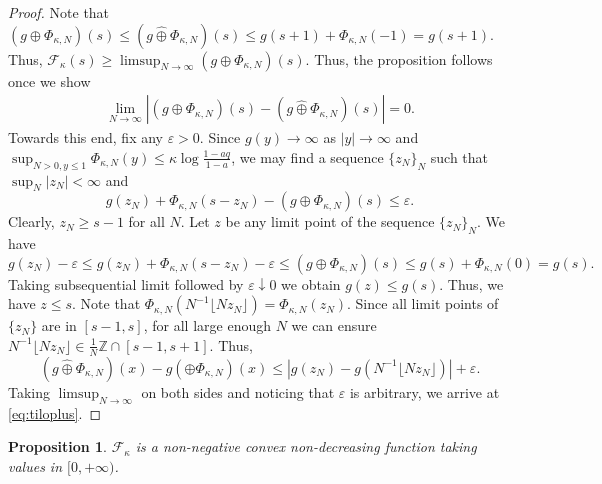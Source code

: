 \documentclass[reqno,11pt]{amsart}
\newcommand{\e}{\varepsilon}
\renewcommand{\hat}{\widehat}
\numberwithin{equation}{section}
\newtheorem{proposition}{Proposition}[section]
\theoremstyle{definition}
\newcommand{\Z}{\mathbb{Z}}
\begin{document}
\begin{proof}
Note that $ \left(g\oplus \Phi_{\kappa,N} \right)(s) \le \left(  g \hat\oplus \Phi_{\kappa,N} \right)(s)   \le g(s+1)+\Phi_{\kappa,N}(-1)=g(s+1)$.  Thus, $\mathcal{F}_\kappa(s) \ge \limsup_{N\to \infty} \left(g\oplus \Phi_{\kappa,N} \right)(s)$. Thus, the proposition follows once we show
    \begin{align}\label{eq:tiloplus}
        \lim_{N\to \infty} |\left(g\oplus \Phi_{\kappa,N} \right)(s)-\left(g\hat\oplus \Phi_{\kappa,N} \right)(s)|=0.
    \end{align}
Towards this end, fix any $\varepsilon>0$. Since $g(y)\to \infty$ as $|y|\to \infty$ and $\sup_{N>0, y\le 1} \Phi_{\kappa,N}(y) \le \kappa \log \frac{1-aq}{1-a}$, we may find a sequence $\{z_N\}_N$ such that $\sup_N |z_N|<\infty$ and 
$$g(z_N)+\Phi_{\kappa,N}(s-z_N)-(g\oplus \Phi_{\kappa,N})(s) \le \e.$$ 
Clearly, $z_N\ge s-1$ for all $N$. Let $z$ be any limit point of the sequence $\{z_N\}_N$. We have 
$$g(z_N)-\e\le g(z_N)+\Phi_{\kappa,N}(s-z_N)-\varepsilon \le (g\oplus \Phi_{\kappa,N})(s) \le g(s)+\Phi_{\kappa,N}(0)=g(s).$$ 
Taking subsequential limit followed by $\e\downarrow 0$ we obtain $g(z) \le g(s)$. Thus, we have $z\le s$. Note that $\Phi_{\kappa,N}(N^{-1}\lfloor Nz_N\rfloor)=\Phi_{\kappa,N}(z_N)$. Since all limit points of $\{z_N\}$ are in $[s-1,s]$, for all large enough $N$ we can ensure $N^{-1}\lfloor Nz_N\rfloor \in \frac1N\Z\cap[s-1,s+1]$. Thus,
$$(g\hat\oplus\Phi_{\kappa,N})(x)-g(\oplus \Phi_{\kappa,N})(x) \le |g(z_N)-g(N^{-1}\lfloor Nz_N\rfloor)|+\varepsilon.$$
Taking $\limsup_{N\to\infty}$ on both sides and noticing that $\e$ is arbitrary, we arrive at \eqref{eq:tiloplus}. \end{proof}



\begin{proposition}\label{prop:fcon} $\mathcal{F}_\kappa$ is a non-negative convex non-decreasing function taking values in $[0,+\infty)$.
\end{proposition}
\end{document}
